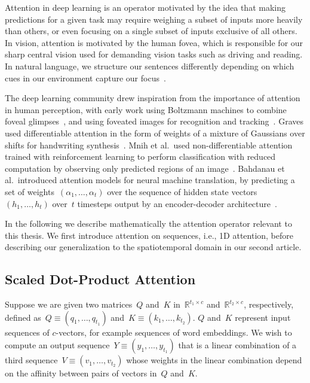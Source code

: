 Attention in deep learning is an operator motivated by the idea that making
predictions for a given task may require weighing a subset of inputs more
heavily than others, or even focusing on a single subset of inputs exclusive of
all others.
In vision, attention is motivated by the human fovea, which is responsible for
our sharp central vision used for demanding vision tasks such as driving and
reading.
In natural language, we structure our sentences differently depending on which
cues in our environment capture our focus~\cite{myachykov2005attention}.

The deep learning community drew inspiration from the importance of attention
in human perception, with early work using Boltzmann machines to combine foveal
glimpses~\cite{larochelle2010learning}, and using foveated images for
recognition and tracking~\cite{denil2012learning}.
Graves used differentiable attention in the form of weights of a mixture of
Gaussians over shifts for handwriting synthesis~\cite{graves2013generating}.
Mnih et al.\ used non-differentiable attention trained with reinforcement
learning to perform classification with reduced computation by observing only
predicted regions of an image~\cite{mnih2014recurrent}.
Bahdanau et al.\ introduced attention models for neural machine translation,
by predicting a set of weights~$(\alpha_1, \dots, \alpha_t)$ over the sequence
of hidden state vectors~$(h_1, \dots, h_t)$ over~$t$ timesteps output by an
encoder-decoder architecture~\cite{cho2014ontheproperties}.

In the following we describe mathematically the attention operator relevant to
this thesis.
We first introduce attention on sequences, i.e., 1D attention, before
describing our generalization to the spatiotemporal domain in our second
article.


\subsection{Scaled Dot-Product Attention}

Suppose we are given two matrices~$Q$ and~$K$ in~$\mathbb{R}^{t_1 \times c}$
and~$\mathbb{R}^{t_2\times c}$, respectively, defined
as~$Q \equiv (q_1, \dots, q_{t_1})$ and~$K \equiv (k_1, \dots, k_{t_2})$.
$Q$ and~$K$ represent input sequences of $c$-vectors, for example sequences of
word embeddings.
We wish to compute an output sequence~$Y \equiv (y_1, \dots, y_{t_1})$ that is
a linear combination of a third sequence~$V \equiv (v_1, \dots, v_{t_2})$ whose
weights in the linear combination depend on the affinity between pairs of
vectors in~$Q$ and~$K$.

